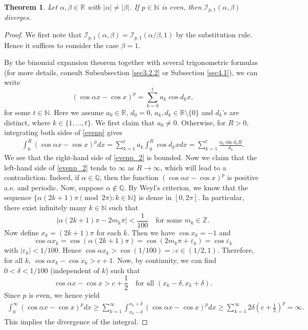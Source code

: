 \documentclass[12pt, reqno]{amsart}
\theoremstyle{plain}
\newtheorem{theorem}{Theorem}[section]
\theoremstyle{definition}
\begin{document}


\begin{theorem}\label{thm3.1}
Let $\alpha, \beta\in\mathbb{R}$ with $|\alpha|\ne|\beta|$. If $p\in\mathbb{N}$ is even, then $\mathcal{I}_{p, 1}(\alpha, \beta)$ diverges.
\end{theorem}
\begin{proof}
 We first note that $\mathcal{I}_{p, 1}(\alpha, \beta)=\mathcal{I}_{p, 1}(\alpha/\beta, 1)$ by the substitution rule. Hence it suffices to consider the case $\beta=1$.
 
    By the binomial expansion theorem together with several trigonometric formulas (for more details, consult Subsubsection \ref{sec3.2.2} or Subsection \ref{sec4.1}), we can write
    \begin{equation}\label{evenp}
        (\cos \alpha x-\cos x)^p=\sum_{k=0}^ta_k\cos d_kx,
    \end{equation}
    for some $t\in\mathbb{N}$. Here we assume $a_0\in\mathbb{R}$, $d_0=0$, $a_k, d_k\in\mathbb{R}\setminus\{0\}$ and $d_k$'s are distinct, where $k\in\{1, \ldots, t\}$. We first claim that $a_0\ne 0$. Otherwise, for $R>0$, integrating both sides of \eqref{evenp} gives
    \begin{align}\label{evenp_2}
        \int_0^{R}(\cos\alpha x-\cos x)^pdx=\sum_{k=1}^ta_k\int_0^R\cos d_kxdx=\sum_{k=1}^t\frac{a_k\sin d_kR}{d_k}.
    \end{align}
    We see that the right-hand side of \eqref{evenp_2} is bounded. Now we claim that the left-hand side of \eqref{evenp_2} tends to $\infty$ as $R\to\infty$, which will lead to a contradiction. Indeed, if $\alpha\in\mathbb{Q}$, then the function $(\cos\alpha x-\cos x)^p$ is positive a.e. and periodic. Now, suppose $\alpha\not\in\mathbb{Q}$. By Weyl's criterion, we know that the sequence
    $\{\alpha(2k+1)\pi \pmod{2\pi} : k\in\mathbb{N}\}$
    is dense in $[0, 2\pi]$. In particular, there exist infinitely many $k\in\mathbb{N}$ such that
    \[|\alpha(2k+1)\pi-2m_k\pi|<\frac{1}{100} \quad\text{for some } m_k\in\mathbb{Z}.\]
    Now define $x_k=(2k+1)\pi$ for each $k$. Then we have $\cos x_k=-1$ and 
    \[\cos \alpha x_k=\cos(\alpha(2k+1)\pi)=\cos(2m_k\pi+\varepsilon_k)=\cos \varepsilon_k\]
    with $|\varepsilon_k|<1/100$. Hence $\cos \alpha x_k>\cos (1/100)=: c\in(1/2, 1)$. Therefore, for all $k$, $\cos \alpha x_k-\cos x_k>c+1$. Now, by continuity, we can find  $0<\delta<1/100$ (independent of $k$) such that 
    \[\cos\alpha x-\cos x>c+\frac{1}{2}\quad \text{for all } (x_k-\delta, x_k+\delta).\]
    Since $p$ is even, we hence yield
    \begin{align*}
        \int_0^{\infty}(\cos\alpha x-\cos x)^pdx\ge \sum_{k=1}^{\infty}\int_{x_k-\delta}^{x_k+\delta}(\cos\alpha x-\cos x)^pdx \ge \sum_{k=1}^{\infty}2\delta \left(c+\frac{1}{2}\right)^p=\infty.
    \end{align*}
    This implies the divergence of the integral.
    

\end{proof}
\end{document}
